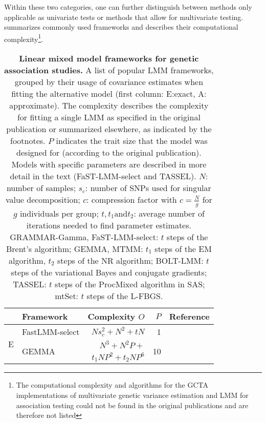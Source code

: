 Within these two categories, one can further distinguish between methods only applicable as univariate tests or methods that allow for multivariate testing.  summarizes commonly used frameworks and describes their computational complexity\footnote{The computational complexity and algorithms for the GCTA implementations \citep{Yang2011} of multivariate genetic variance estimation \citep{Lee2012} and LMM for association testing \citep{Yang2014} could not be found in the original publications and are therefore not listed}.
\\
\begin{table}[h]
  \centering
  \caption[\textbf{Linear mixed model frameworks for genetic association studies.}]{\textbf{Linear mixed model frameworks for genetic association studies.} A list of popular LMM frameworks, grouped by their usage of covariance estimates when fitting the alternative model (first column: E:exact, A: approximate). The complexity describes the complexity for fitting a single LMM as specified in the original publication or summarized elsewhere, as indicated by the footnotes. \(P\) indicates the trait size that the model was designed for (according to the original publication). Models with specific parameters are described in more detail in the text (FaST-LMM-select and TASSEL). \(N\): number of samples;  \(s_c\): number of SNPs used for singular value decomposition; \(c\):  compression factor with \(c=\frac{N}{g}\) for \(g\) individuals per group; \(t, t_1 \text{and} t_2\): average number of iterations needed to find parameter estimates. GRAMMAR-Gamma, FaST-LMM-select: \(t\) steps of the Brent's algorithm;  GEMMA, MTMM: \(t_1\) steps of the EM algorithm, \(t_2\) steps of the NR algorithm; BOLT-LMM: \(t\) steps of the variational Bayes and conjugate gradients; TASSEL: \(t\) steps of the ProcMixed algorithm in SAS; mtSet: \(t\) steps of the L-FBGS.}
  \begin{small}
     \begin{tabular}{llrrr}
    \toprule
     & Framework & Complexity \(O\) & \(P\) & Reference \\
    \midrule
    \multirow{3}[1]{*}{E} & FastLMM-select & \(Ns_c^2 + N^2 + tN\) & \num{1} & \citep{Lippert2011} \\
          & \multicolumn{1}{l}{\multirow{2}[0]{*}{GEMMA}} & \(N^3 + N^2P  + \)&  \multirow{2}[0]{*}{\num{10}} & \citep{Zhou2014} \\
          \addlinespace[-.2ex]
          & & \( t_1NP^2 + t_2NP^6\) & &\citep{Zhou2014} \\

\end{tabular}
\end{small}
\end{table}
